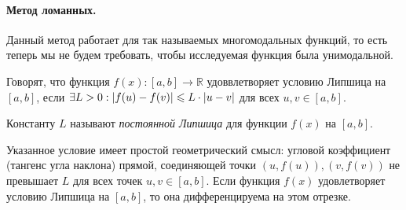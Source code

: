 
\paragraph{Метод ломанных. } Данный метод работает для так называемых многомодальных функций, то есть теперь мы не будем требовать, чтобы исследуемая функция была унимодальной. 

\begin{definition}
	Говорят, что функция $f(x): [a, b] \to \mathbb{R}$ удоввлетворяет условию Липшица на $[a, b]$, если $\exists L > 0: \abs{f(u) - f(v)} \leqslant L \cdot \abs{u - v}$ для всех $u, v \in [a, b]$. 
	
	Константу $L$ называют \textit{постоянной Липшица} для функции $f(x)$ на $[a, b]$.
\end{definition}

\begin{utv}
	Указанное условие имеет простой геометрический смысл: угловой коэффициент (тангенс угла наклона) прямой, соединяющей точки $(u, f(u)), (v, f(v))$ не превышает $L$ для всех точек $u, v \in [a, b]$. 
	Если функция $f(x)$ удовлетворяет условию Липшица на $[a, b]$, то она дифференцируема на этом отрезке. 
\end{utv}
